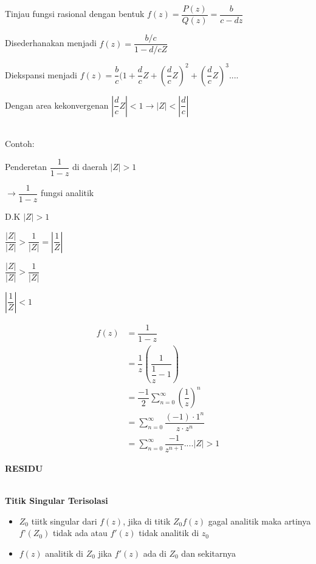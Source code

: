 \documentclass{article}
\begin{document}
Tinjau fungsi rasional dengan bentuk $f(z) = \dfrac{P(z)}{Q(z)} = \dfrac{b}{c-dz}$

Disederhanakan menjadi $f(z) = \dfrac{b/c}{1-d/c Z}$

Diekspansi menjadi $f(z) = \dfrac{b}{c}(1+\dfrac{d}{c}Z+(\dfrac{d}{c}Z)^2+(\dfrac{d}{c}Z)^3....$

Dengan area kekonvergenan $|\dfrac{d}{c}Z|<1 \rightarrow |Z|<|\dfrac{d}{c}|$

\leavevmode\\

Contoh:

Penderetan $\dfrac{1}{1-z}$ di daerah $|Z|>1$

$\rightarrow \dfrac{1}{1-z}$ fungsi analitik

D.K $|Z|>1$

$\dfrac{|Z|}{|Z|}>\dfrac{1}{|Z|} = |\dfrac{1}{Z}|$

$\dfrac{|Z|}{|Z|}>\dfrac{1}{|Z|}$

$|\dfrac{1}{Z}|<1$

\begin{align*}
    f(z) & = \dfrac{1}{1-z}
    \nonumber                                                        \\
         & = \dfrac{1}{z} (\dfrac{1}{\dfrac{1}{z}-1})
    \nonumber                                                        \\
         & = \dfrac{-1}{2} \sum_{n=0}^{\infty}(\dfrac{1}{z})^n
    \nonumber                                                        \\
         & = \sum_{n=0}^{\infty} \dfrac{(-1) \cdot 1^n}{z \cdot z^n}
    \nonumber                                                        \\
         & = \sum_{n=0}^{\infty} \dfrac{-1}{z^{n+1}} .... |Z|>1
\end{align*}



\newpage
\begin{center}
    \textbf{RESIDU}
\end{center}
\leavevmode\\

\textbf{Titik Singular Terisolasi}
\begin{itemize}
    \item $Z_0$ tiitk singular dari $f(z)$, jika di titik $Z_0 f(z)$ gagal analitik maka artinya $f’(Z_0)$ tidak ada atau $f'(z)$ tidak analitik di $z_0$
    \item $f(z)$ analitik di $Z_0$ jika $f'(z)$ ada di $Z_0$ dan sekitarnya
\end{itemize}
\leavevmode\\
\end{document}
